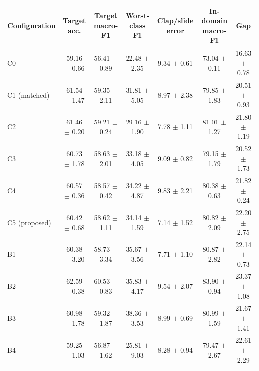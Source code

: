 \begin{tabular}{@{}lcccccc@{}}
\toprule
Configuration & Target acc. & Target macro-F1 & Worst-class F1 & Clap/slide error & In-domain macro-F1 & Gap \\
\midrule
C0 & 59.16 $\pm$ 0.66 & 56.41 $\pm$ 0.89 & 22.48 $\pm$ 2.35 & 9.34 $\pm$ 0.61 & 73.04 $\pm$ 0.11 & 16.63 $\pm$ 0.78 \\
C1 (matched) & 61.54 $\pm$ 1.47 & 59.35 $\pm$ 2.11 & 31.81 $\pm$ 5.05 & 8.97 $\pm$ 2.38 & 79.85 $\pm$ 1.83 & 20.51 $\pm$ 0.93 \\
C2 & 61.46 $\pm$ 0.20 & 59.21 $\pm$ 0.24 & 29.16 $\pm$ 1.90 & 7.78 $\pm$ 1.11 & 81.01 $\pm$ 1.27 & 21.80 $\pm$ 1.19 \\
C3 & 60.73 $\pm$ 1.78 & 58.63 $\pm$ 2.01 & 33.18 $\pm$ 4.05 & 9.09 $\pm$ 0.82 & 79.15 $\pm$ 1.79 & 20.52 $\pm$ 1.73 \\
C4 & 60.57 $\pm$ 0.36 & 58.57 $\pm$ 0.42 & 34.22 $\pm$ 4.87 & 9.83 $\pm$ 2.21 & 80.38 $\pm$ 0.63 & 21.82 $\pm$ 0.24 \\
C5 (proposed) & 60.42 $\pm$ 0.68 & 58.62 $\pm$ 1.11 & 34.14 $\pm$ 1.59 & 7.14 $\pm$ 1.52 & 80.82 $\pm$ 2.09 & 22.20 $\pm$ 2.75 \\
\midrule
B1 & 60.38 $\pm$ 3.20 & 58.73 $\pm$ 3.34 & 35.67 $\pm$ 3.56 & 7.71 $\pm$ 1.10 & 80.87 $\pm$ 2.82 & 22.14 $\pm$ 0.73 \\
B2 & 62.59 $\pm$ 0.38 & 60.53 $\pm$ 0.83 & 35.83 $\pm$ 4.17 & 9.54 $\pm$ 2.07 & 83.90 $\pm$ 0.94 & 23.37 $\pm$ 1.08 \\
B3 & 60.98 $\pm$ 1.78 & 59.32 $\pm$ 1.87 & 38.36 $\pm$ 3.53 & 8.99 $\pm$ 0.69 & 80.99 $\pm$ 1.59 & 21.67 $\pm$ 1.41 \\
B4 & 59.25 $\pm$ 1.03 & 56.87 $\pm$ 1.62 & 25.81 $\pm$ 9.03 & 8.28 $\pm$ 0.94 & 79.47 $\pm$ 2.67 & 22.61 $\pm$ 2.29 \\
\bottomrule
\end{tabular}
